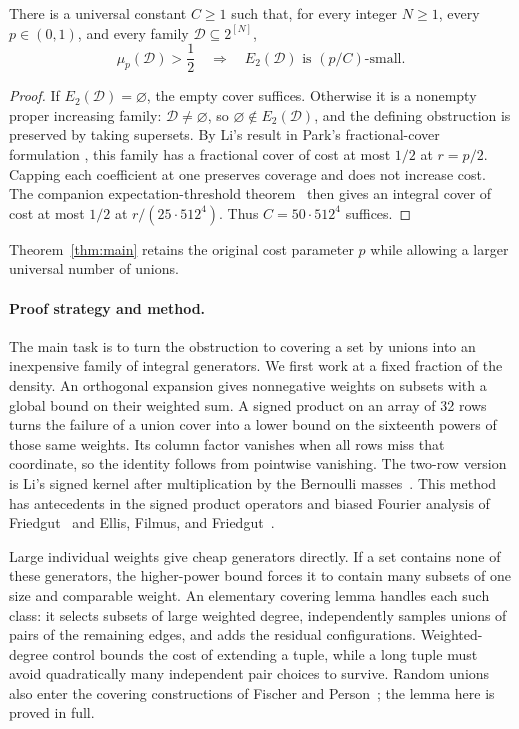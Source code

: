 \begin{corollary}
\label{cor:two-union}
There is a universal constant $C\ge1$ such that, for every integer $N\ge1$,
every $p\in(0,1)$, and every family $\mathcal D\subseteq2^{[N]}$,
\[
\mu_p(\mathcal D)>\frac12
\quad\Longrightarrow\quad
E_2(\mathcal D)\text{ is }(p/C)\text{-small}.
\]
\end{corollary}

\begin{proof}
If $E_2(\mathcal D)=\varnothing$, the empty cover suffices. Otherwise
it is a nonempty proper increasing family: $\mathcal D\ne\varnothing$,
so $\varnothing\notin E_2(\mathcal D)$, and the defining obstruction
is preserved by taking supersets. By Li's result
\cite[Corollary~3.1]{Li26} in Park's fractional-cover formulation
\cite[Theorem~3.4]{Park26}, this family has a fractional cover of cost
at most $1/2$ at $r=p/2$. Capping each coefficient at one preserves
coverage and does not increase cost. The companion expectation-threshold
theorem~\cite[Theorem~1.1]{OpenAIThreshold26} then gives an integral cover
of cost at most $1/2$ at
$r/(25\cdot512^4)$. Thus $C=50\cdot512^4$ suffices.
\end{proof}

Theorem~\ref{thm:main} retains the original cost parameter $p$ while
allowing a larger universal number of unions.

\paragraph{Proof strategy and method.}
The main task is to turn the obstruction to covering a set by unions
into an inexpensive family of integral generators. We first work at a
fixed fraction of the density. An orthogonal expansion gives nonnegative
weights on subsets with a global bound on their weighted sum. A signed
product on an array of 32 rows turns the failure of a union cover into
a lower bound on the sixteenth powers of those same weights. Its column
factor vanishes when all rows miss that coordinate, so the identity
follows from pointwise vanishing. The two-row version is Li's signed
kernel after multiplication by the Bernoulli masses~\cite[Section~2]{Li26}.
This method has antecedents
in the signed product operators and biased Fourier analysis of
Friedgut~\cite[Section~2.2]{Friedgut08} and Ellis, Filmus, and
Friedgut~\cite[Sections~2.2 and~4.1]{EllisFilmusFriedgut12}.

Large individual weights give cheap generators directly. If a set
contains none of these generators, the higher-power bound forces it
to contain many subsets of one size and comparable weight. An elementary
covering lemma handles each such class: it selects subsets of large
weighted degree, independently samples unions of pairs of the remaining
edges, and adds the residual configurations. Weighted-degree control
bounds the cost of extending a tuple, while a long tuple must avoid
quadratically many independent pair choices to survive. Random unions
also enter the covering constructions of Fischer and
Person~\cite[Sections~1.1 and~2]{FischerPerson25}; the lemma here is proved
in full.

